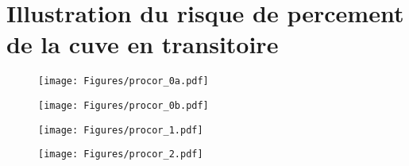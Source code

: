 \section{Illustration du risque de percement de la cuve en transitoire}
\begin{frame}[fragile]
\baselineskip
\begin{figure}[H]
\centering \texttt{[image: Figures/procor\_0a.pdf]} 
\end{figure}
\end{frame}
\begin{frame}[fragile]
\baselineskip
\begin{figure}[H]
\centering \texttt{[image: Figures/procor\_0b.pdf]} 
\end{figure}
\end{frame}
\begin{frame}[fragile]
\baselineskip
\begin{figure}[H]
\centering \texttt{[image: Figures/procor\_1.pdf]} 
\end{figure}
\end{frame}
\begin{frame}[fragile]
\baselineskip
\begin{figure}[H]
\centering \texttt{[image: Figures/procor\_2.pdf]} 
\end{figure}
\end{frame}
